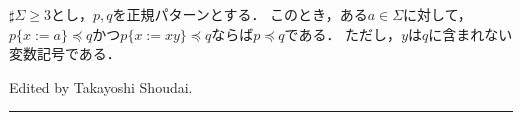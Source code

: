 \begin{lem}\label{補題15}
$\sharp \Sigma \ge 3$とし，$p,q$を正規パターンとする．
このとき，ある$a \in \Sigma$に対して，
$p \{ x := a \} \preceq q$かつ$p \{ x := xy \} \preceq q$ならば$p \preceq q$である．
ただし，$y$は$q$に含まれない変数記号である．
\end{lem}

\hfill Edited by Takayoshi Shoudai.
\hrule
\bigskip

%
